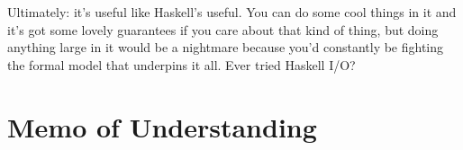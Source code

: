 \documentclass{article}
\begin{document}
Ultimately: it's useful like Haskell's useful. You can do some cool things in it and it's got some lovely guarantees if
you care about that kind of thing, but doing anything large in it would be a nightmare because you'd constantly be
fighting the formal model that underpins it all. Ever tried Haskell I/O?\par



\section{Memo of Understanding} %


\end{document}
